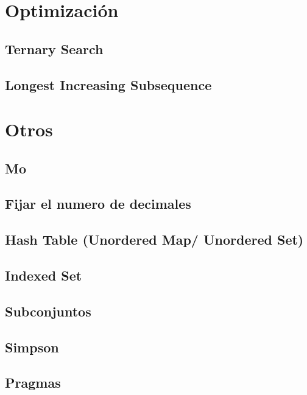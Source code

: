 \documentclass[a4paper,11pt,landscape,twocolumn]{article}
\begin{document}
\section{Optimización} %
\subsection{Ternary Search}

\subsection{Longest Increasing Subsequence}


\section{Otros} %
\subsection{Mo}

\subsection{Fijar el numero de decimales}

\subsection{Hash Table (Unordered Map/ Unordered Set)}

\subsection{Indexed Set}

\subsection{Subconjuntos}

\subsection{Simpson}

\subsection{Pragmas}

\end{document}
